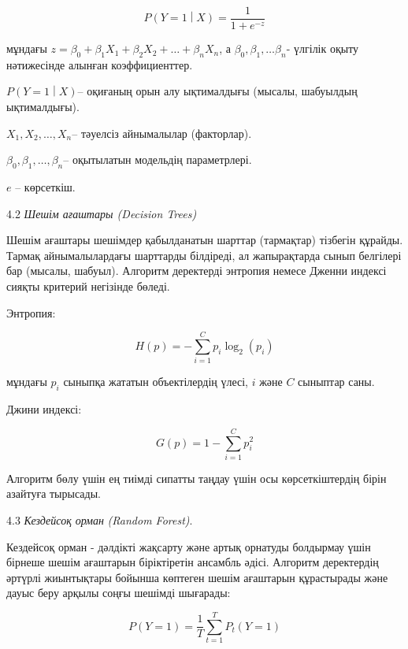 \begin{equation}
P\left( Y = 1 \middle| X \right) = \frac{1}{1 + e^{- z}}
\end{equation}

мұндағы
\(z = \beta_{0} + \beta_{1}X_{1} + \beta_{2}X_{2} + \ldots + \beta_{n}X_{n}\),
а \(\beta_{0},\beta_{1},\ldots\beta_{n}\)- үлгілік оқыту нәтижесінде
алынған коэффициенттер.

\(P\left( Y = 1 \middle| X \right)\)-- оқиғаның орын алу ықтималдығы
(мысалы, шабуылдың ықтималдығы).

\(X_{1},X_{2},\ldots,X_{n}\)-- тәуелсіз айнымалылар (факторлар).

\(\beta_{0},\beta_{1},\ldots,\beta_{n}\)-- оқытылатын модельдің
параметрлері.

\(e\) -- көрсеткіш.

4.2 \emph{Шешім ағаштары (Decision Trees)}

Шешім ағаштары шешімдер қабылданатын шарттар (тармақтар) тізбегін
құрайды. Тармақ айнымалылардағы шарттарды білдіреді, ал жапырақтарда
сынып белгілері бар (мысалы, шабуыл). Алгоритм деректерді энтропия
немесе Дженни индексі сияқты критерий негізінде бөледі.

Энтропия:

\begin{equation}
H(p) = - \sum_{i = 1}^{C}{p_{i}\log_{2}(p_{i})}
\end{equation}

мұндағы \(p_{i}\) сыныпқа жататын объектілердің үлесі, \(i\) және \(C\)
сыныптар саны.

Джини индексі:

\begin{equation}
G(p) = 1 - \sum_{i = 1}^{C}p_{i}^{2}
\end{equation}

Алгоритм бөлу үшін ең тиімді сипатты таңдау үшін осы көрсеткіштердің
бірін азайтуға тырысады.

4.3 \emph{Кездейсоқ орман} \emph{(Random Forest)}.

Кездейсоқ орман - дәлдікті жақсарту және артық орнатуды болдырмау үшін
бірнеше шешім ағаштарын біріктіретін ансамбль әдісі. Алгоритм
деректердің әртүрлі жиынтықтары бойынша көптеген шешім ағаштарын
құрастырады және дауыс беру арқылы соңғы шешімді шығарады:

\begin{equation}
P(Y = 1) = \frac{1}{T}\sum_{t = 1}^{T}{P_{t}(Y = 1)}
\end{equation}

